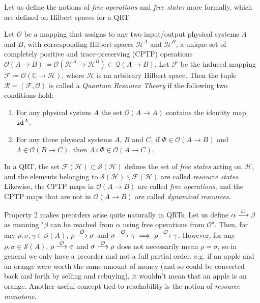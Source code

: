 Let us define the notions of \textit{free operations} and \textit{free states} more formally, which are defined on Hilbert spaces for a QRT.

\begin{definition} %
    Let $\mathcal{O}$ be a mapping that assigns to any two input/output physical systems $A$ and $B$, with corresponding Hilbert spaces $\mathcal{H}^A$ and $\mathcal{H}^B$, a unique set of completely positive and trace-preserving (CPTP) operations $\mathcal{O}(A \rightarrow B) \coloneqq \mathcal{O}(\mathcal{H}^A \rightarrow \mathcal{H}^B) \subset \mathcal{Q}(A \rightarrow B)$. Let $\mathcal{F}$ be the induced mapping $\mathcal{F} \coloneqq \mathcal{O}(\mathbb{C} \rightarrow \mathcal{H})$, where $\mathcal{H}$ is an arbitrary Hilbert space. Then the tuple $\mathcal{R} = (\mathcal{F}, \mathcal{O})$ is called a \textit{Quantum Resource Theory} if the following two conditions hold:

    \begin{enumerate}
        \item For any physical system $A$ the set $\mathcal{O}(A \rightarrow A)$ contains the identity map $\verb|id|^A$.
        \item For any three physical systems $A$, $B$ and $C$, if $\Phi \in \mathcal{O}(A \rightarrow B)$ and $\Lambda \in \mathcal{O}(B \rightarrow C)$, then $\Lambda \circ \Phi \in \mathcal{O}(A \rightarrow C)$.
    \end{enumerate}

    \noindent In a QRT, the set $\mathcal{F}(\mathcal{H}) \subset \mathcal{S}(\mathcal{H})$ defines the set of \textit{free states} acting on $\mathcal{H}$, and the elements belonging to $\mathcal{S}(\mathcal{H}) \backslash \mathcal{F}(\mathcal{H})$ are called \textit{resource states}. Likewise, the CPTP maps in $\mathcal{O}(A \rightarrow B)$ are called \textit{free operations}, and the CPTP maps that are not in $\mathcal{O}(A \rightarrow B)$ are called \textit{dynamical resources}.
\end{definition}

Property 2 makes preorders arise quite naturally in QRTs. Let us define $\alpha \overset{\mathcal{O}}{\longrightarrow} \beta$ as meaning "$\beta$ can be reached from $\alpha$ using free operations from $\mathcal{O}$". Then, for any $\rho, \sigma, \gamma \in \mathcal{S}(A)$, $\rho \overset{\mathcal{O}}{\longrightarrow} \sigma$ and $\sigma \overset{\mathcal{O}}{\longrightarrow} \gamma \implies \rho \overset{\mathcal{O}}{\longrightarrow} \gamma$. However, for any $\rho, \sigma \in \mathcal{S}(A)$, $\rho \overset{\mathcal{O}}{\longrightarrow} \sigma$ and $\sigma \overset{\mathcal{O}}{\longrightarrow} \rho$ does not necessarily mean $\rho = \sigma$, so in general we only have a preorder and not a full partial order, e.g. if an apple and an orange were worth the same amount of money (and so could be converted back and forth by selling and rebuying), it wouldn't mean that an apple is an orange. Another useful concept tied to reachability is the notion of \textit{resource monotone}.

